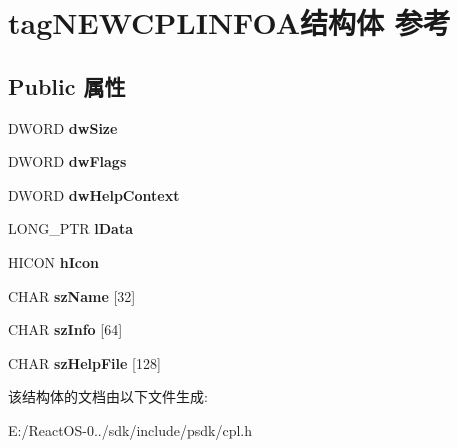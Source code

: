 \hypertarget{structtag_n_e_w_c_p_l_i_n_f_o_a}{}\section{tag\+N\+E\+W\+C\+P\+L\+I\+N\+F\+O\+A结构体 参考}
\label{structtag_n_e_w_c_p_l_i_n_f_o_a}
\subsection*{Public 属性}
\begin{DoxyCompactItemize}
\item 
\mbox{\label{structtag_n_e_w_c_p_l_i_n_f_o_a_a336f31ccab37e269ec404b2de4626af6}} 
D\+W\+O\+RD {\bfseries dw\+Size}
\item 
\mbox{\label{structtag_n_e_w_c_p_l_i_n_f_o_a_ac160f2a8054c472e008728817c6badb2}} 
D\+W\+O\+RD {\bfseries dw\+Flags}
\item 
\mbox{\label{structtag_n_e_w_c_p_l_i_n_f_o_a_af6fb07b5905680d0deff69e96538ce30}} 
D\+W\+O\+RD {\bfseries dw\+Help\+Context}
\item 
\mbox{\label{structtag_n_e_w_c_p_l_i_n_f_o_a_ae8d119d586596fe5842ebbea1634c035}} 
L\+O\+N\+G\+\_\+\+P\+TR {\bfseries l\+Data}
\item 
\mbox{\label{structtag_n_e_w_c_p_l_i_n_f_o_a_a0566493abe73bf37f46a4d90cd2a298a}} 
H\+I\+C\+ON {\bfseries h\+Icon}
\item 
\mbox{\label{structtag_n_e_w_c_p_l_i_n_f_o_a_a4d649ac44c621ed0c24585e4560670b8}} 
C\+H\+AR {\bfseries sz\+Name} \mbox{[}32\mbox{]}
\item 
\mbox{\label{structtag_n_e_w_c_p_l_i_n_f_o_a_a22afae46900fdd40f9cea2b7c792a9e6}} 
C\+H\+AR {\bfseries sz\+Info} \mbox{[}64\mbox{]}
\item 
\mbox{\label{structtag_n_e_w_c_p_l_i_n_f_o_a_a9bf31c8661cf60496206da1a754111f8}} 
C\+H\+AR {\bfseries sz\+Help\+File} \mbox{[}128\mbox{]}
\end{DoxyCompactItemize}


该结构体的文档由以下文件生成\+:\begin{DoxyCompactItemize}
\item 
E\+:/\+React\+O\+S-\/0../sdk/include/psdk/cpl.\+h\end{DoxyCompactItemize}
